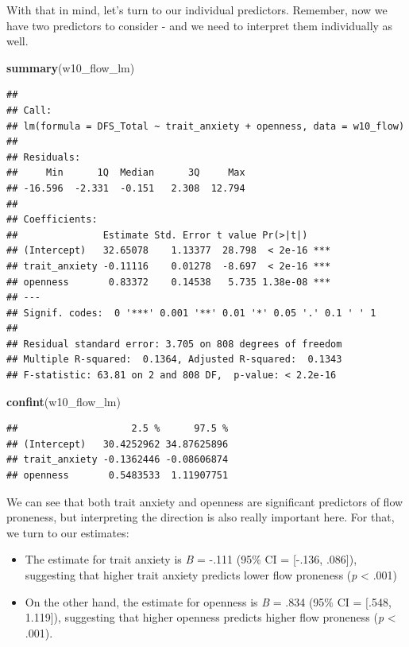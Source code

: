 \documentclass[
]{book}
\newenvironment{Shaded}{\begin{snugshade}}{\end{snugshade}}
\newcommand{\FunctionTok}[1]{\textcolor[rgb]{0.13,0.29,0.53}{\textbf{#1}}}
\newcommand{\NormalTok}[1]{#1}
\providecommand{\tightlist}{%
  \setlength{\itemsep}{0pt}\setlength{\parskip}{0pt}}
\begin{document}
With that in mind, let's turn to our individual predictors. Remember, now we have two predictors to consider - and we need to interpret them individually as well.

\begin{Shaded}
\begin{Highlighting}[]
\FunctionTok{summary}\NormalTok{(w10\_flow\_lm)}
\end{Highlighting}
\end{Shaded}

\begin{verbatim}
## 
## Call:
## lm(formula = DFS_Total ~ trait_anxiety + openness, data = w10_flow)
## 
## Residuals:
##     Min      1Q  Median      3Q     Max 
## -16.596  -2.331  -0.151   2.308  12.794 
## 
## Coefficients:
##               Estimate Std. Error t value Pr(>|t|)    
## (Intercept)   32.65078    1.13377  28.798  < 2e-16 ***
## trait_anxiety -0.11116    0.01278  -8.697  < 2e-16 ***
## openness       0.83372    0.14538   5.735 1.38e-08 ***
## ---
## Signif. codes:  0 '***' 0.001 '**' 0.01 '*' 0.05 '.' 0.1 ' ' 1
## 
## Residual standard error: 3.705 on 808 degrees of freedom
## Multiple R-squared:  0.1364, Adjusted R-squared:  0.1343 
## F-statistic: 63.81 on 2 and 808 DF,  p-value: < 2.2e-16
\end{verbatim}

\begin{Shaded}
\begin{Highlighting}[]
\FunctionTok{confint}\NormalTok{(w10\_flow\_lm)}
\end{Highlighting}
\end{Shaded}

\begin{verbatim}
##                    2.5 %      97.5 %
## (Intercept)   30.4252962 34.87625896
## trait_anxiety -0.1362446 -0.08606874
## openness       0.5483533  1.11907751
\end{verbatim}

We can see that both trait anxiety and openness are significant predictors of flow proneness, but interpreting the direction is also really important here. For that, we turn to our estimates:

\begin{itemize}
\tightlist
\item
  The estimate for trait anxiety is \emph{B} = -.111 (95\% CI = {[}-.136, .086{]}), suggesting that higher trait anxiety predicts lower flow proneness (\emph{p} \textless{} .001)
\item
  On the other hand, the estimate for openness is \emph{B} = .834 (95\% CI = {[}.548, 1.119{]}), suggesting that higher openness predicts higher flow proneness (\emph{p} \textless{} .001).
\end{itemize}
\end{document}
